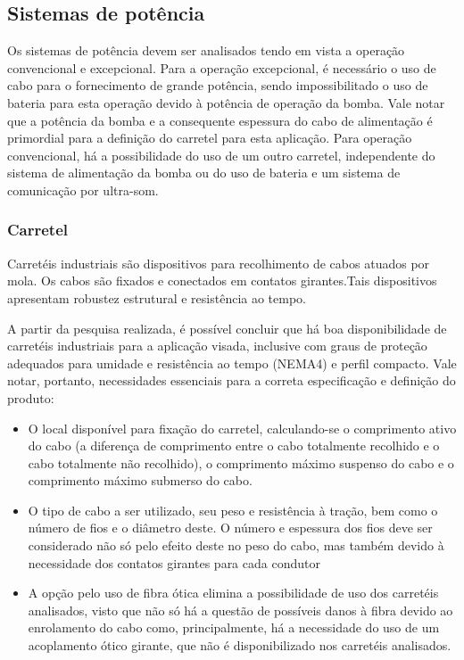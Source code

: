 \subsection{Sistemas de potência}
Os sistemas de potência devem ser analisados tendo em vista a operação convencional e excepcional. Para a operação excepcional, é necessário o uso de cabo para o fornecimento de grande potência, sendo impossibilitado o uso de bateria para esta operação devido à potência de operação da bomba. Vale notar que a potência da bomba e a consequente espessura do cabo de alimentação é primordial para a definição do carretel para esta aplicação. 
Para operação convencional, há a possibilidade do uso de um outro carretel, independente do sistema de alimentação da bomba ou do uso de bateria e um sistema de comunicação por ultra-som.
 
\subsubsection{Carretel}
Carretéis industriais são dispositivos para recolhimento de cabos atuados por mola. Os cabos são fixados e conectados em contatos girantes.Tais dispositivos apresentam robustez estrutural e resistência ao tempo.
 
A partir da pesquisa realizada, é possível concluir que há boa disponibilidade de carretéis industriais para a aplicação visada, inclusive com graus de proteção adequados para umidade e resistência ao tempo (NEMA4) e perfil compacto. Vale notar, portanto, necessidades essenciais para a correta especificação e definição do produto:
\begin{itemize}
  \item O local disponível para fixação do carretel, calculando-se o comprimento ativo do cabo (a diferença de comprimento entre o cabo totalmente recolhido e o cabo totalmente não recolhido), o comprimento máximo suspenso do cabo e o comprimento máximo submerso do cabo.
  
  \item O tipo de cabo a ser utilizado, seu peso e resistência à tração, bem como o número de fios e o diâmetro deste. O número e espessura dos fios deve ser considerado não só pelo efeito deste no peso do cabo, mas também devido à necessidade dos contatos girantes para cada condutor
 
  \item A opção pelo uso de fibra ótica elimina a possibilidade de uso dos carretéis analisados, visto que não só há a questão de possíveis danos à fibra devido ao enrolamento do cabo como, principalmente, há a necessidade do uso de um acoplamento ótico girante, que não é disponibilizado nos carretéis analisados.
\end{itemize}
